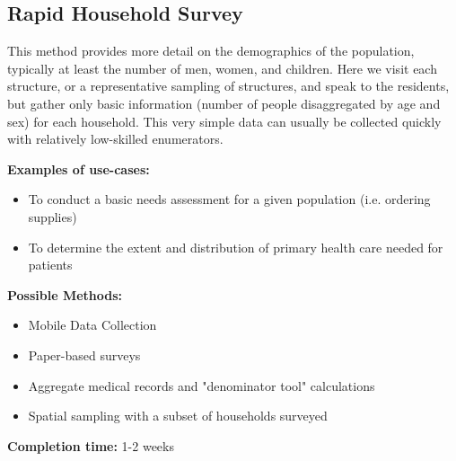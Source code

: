 \documentclass[a4paper,12pt,twoside]{article}
\begin{document}
\subsection{Rapid Household Survey}
This method provides more detail on the demographics of the population, typically at least the number of men, women, and children. Here we visit each structure, or a representative sampling of structures, and speak to the residents, but gather only basic information (number of people disaggregated by age and sex) for each household. This very simple data can usually be collected quickly with relatively low-skilled enumerators.

\noindent
\textbf{Examples of use-cases:}

\begin{itemize}
    \item To conduct a basic needs assessment for a given population (i.e. ordering supplies)
    \item To determine the extent and distribution of primary health care needed for patients
\end{itemize}

\noindent
\textbf{Possible Methods:}
\begin{itemize}
    \item Mobile Data Collection
    \item Paper-based surveys
    \item Aggregate medical records and "denominator tool" calculations
    \item Spatial sampling with a subset of households surveyed
\end{itemize}

\noindent
\textbf{Completion time:} 1-2 weeks
\end{document}
